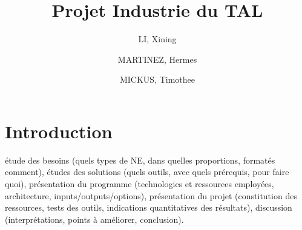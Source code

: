 \documentclass{article}
\title{Projet Industrie du TAL}
\author{LI, Xining \and MARTINEZ, Hermes \and MICKUS, Timothee}
\begin{document}
\maketitle

\section{Introduction}

étude des besoins (quels types de NE, dans quelles proportions, formatés comment),
études des solutions (quels outils, avec quels prérequis, pour faire quoi),
présentation du programme (technologies et ressources employées, architecture, inputs/outputs/options),
présentation du projet (constitution des ressources, tests des outils, indications quantitatives des résultats),
discussion (interprétations, points à améliorer, conclusion).
\end{document}
